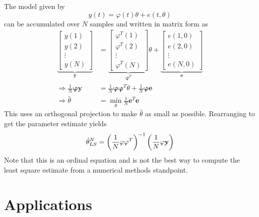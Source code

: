 The model given by
$$y(t) = \varphi(t)\theta + e(t,\theta)$$
can be accumulated over $N$ samples and written in matrix form as
\begin{align*}
\underbrace{\left[\begin{array}{c} y(1) \\ y(2) \\ \vdots \\ y(N) \end{array}\right]}_{\mathbf{y}} &= \underbrace{\left[\begin{array}{c} \varphi^T(1) \\ \varphi^T(2) \\ \vdots \\ \varphi^T(N) \end{array}\right]}_{\mathbf{\varphi}^T} \theta
+ \underbrace{\left[\begin{array}{c} e(1,0) \\ e(2,0) \\ \vdots \\ e(N,0) \end{array}\right]}_{\mathbf{e}} \\
\Rightarrow \frac{1}{N}\mathbf{\varphi}\mathbf{y} &= \frac{1}{N}\mathbf{\varphi}\mathbf{\varphi}^T\theta + \frac{1}{N}\mathbf{\varphi}\mathbf{e} \\
\Rightarrow \hat{\theta} &= \min_\theta \frac{1}{N}\mathbf{e}^T\mathbf{e}
\end{align*}
This uses an orthogonal projection to make $\hat{\theta}$ as small as possible. Rearranging to get the parameter estimate yields
$$\hat{\theta}_{LS}^N = \left(\frac{1}{N}\mathbf{\varphi\varphi}^T\right)^{-1} \left(\frac{1}{N}\mathbf{\varphi y}\right)$$
Note that this is an ordinal equation and is not the best way to compute the least square estimate from a numerical methods standpoint.

\section{Applications}

